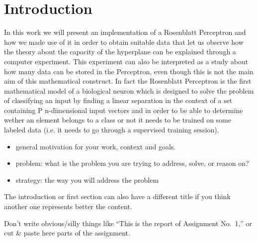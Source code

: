 \section{Introduction}
\label{sec:introduction}

In this work we will present an implementation of a Rosenblatt Perceptron \cite{rosenblatt1958perceptron}
and how we made use of it in order to obtain suitable data that let us observe how the theory about the capacity of the
hyperplane can be explained through a computer experiment. This experiment can also be interpreted as a study about how many
data can be stored in the Perceptron, even though this is not the main aim of this mathematical construct.
In fact the Rosenblatt Perceptron is the first mathematical model of a biological neuron which is designed to
solve the problem of classifying an input by finding a linear separation in the context of a set containing P n-dimensional input vectors
and in order to be able to determine wether an element belongs to a class or not it needs to be trained on some labeled data
(i.e. it needs to go through a supervised training session).

\begin{itemize}
\item general motivation for your work, context and goals.
\item problem: what is the problem you are trying to address, solve, or reason on?
\item strategy: the way you will address the problem
\end{itemize}

The introduction or first section can also have a different title if you think another one represents better the content. 

Don't write obvious/silly things like ``This is the report of Assignment No.\ 1,'' or cut \& paste here parts of the assignment. 
